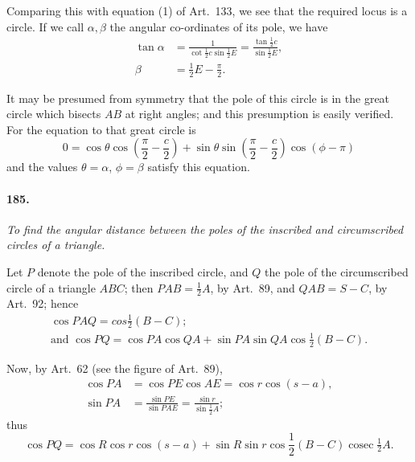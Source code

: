 \documentclass{book}[2004/02/16]
\begin{document}
\begin{mainmatter}
\begin{spacing}{1.3}
Comparing this with equation (1) of Art.~133, we see that the
required locus is a circle. If we call $\alpha, \beta$ the angular co-ordinates
of its pole, we have
\begin{align*}
  \tan \alpha &= \frac{1}{\cot\frac{1}{2}c\sin\frac{1}{2}E}
= \frac{\tan\frac{1}{2}c}{\sin \frac{1}{2}E} ,
\\
  \beta &= \tfrac{1}{2} E - \frac{\pi}{2}.
\end{align*}

It may be presumed from symmetry that the pole of this
circle is in the great circle which bisects $AB$ at right angles;
and this presumption is easily verified. For the equation to
that great circle is
\[
0 = \cos \theta \cos \left(\frac{\pi}{2} - \frac{c}{2}\right)
  + \sin \theta \sin \left(\frac{\pi}{2} - \frac{c}{2}\right)
    \cos (\phi - \pi)
\]
and the values $\theta = \alpha$, $\phi = \beta$ satisfy this equation.

\paragraph{185.} \textit{To find the angular distance between the poles of the
inscribed and circumscribed circles of a triangle.}

Let $P$ denote the pole of the inscribed circle, and $Q$ the pole
of the circumscribed circle of a triangle $ABC$; then $PAB = \frac{1}{2}A$,
by Art.\ 89, and $QAB = S-C$, by Art.\ 92; hence
\begin{gather*}
\cos PAQ = cos\tfrac{1}{2}(B-C);
\\
\text{and } \cos PQ = \cos PA \cos QA + \sin PA \sin QA \cos \tfrac{1}{2}(B-C).
\end{gather*}

Now, by Art.\ 62 (see the figure of Art.\ 89),
\begin{align*}
\cos PA &= \cos PE \cos AE = \cos r \cos(s-a), \\
\sin PA &= \frac{\sin PE}{\sin PAE} = \frac{\sin r}{\sin\tfrac{1}{2}A};
\end{align*}
thus
\[
  \cos PQ
= \cos R \cos r \cos(s-a)
+ \sin R \sin r \cos \frac{1}{2}(B-C)
 \operatorname{cosec} \tfrac{1}{2}A.
\]


\end{spacing}
\end{mainmatter}
\end{document}

